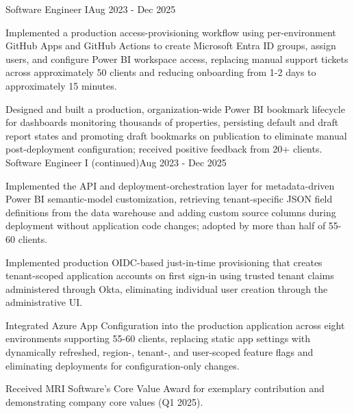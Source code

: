 \vspace{1.0mm}
\resumePositionHeading
{Software Engineer I}{Aug 2023 - Dec 2025}
\vspace{1.5mm}
\resumeItemListStart
    \item{Implemented a production access-provisioning workflow using per-environment GitHub Apps and GitHub Actions to create Microsoft Entra ID groups, assign users, and configure Power BI workspace access, replacing manual support tickets across approximately 50 clients and reducing onboarding from 1-2 days to approximately 15 minutes.}
    \item{Designed and built a production, organization-wide Power BI bookmark lifecycle for dashboards monitoring thousands of properties, persisting default and draft report states and promoting draft bookmarks on publication to eliminate manual post-deployment configuration; received positive feedback from 20+ clients.}
\resumeItemListEnd
\newpage
{}
\resumePositionHeading
{Software Engineer I (continued)}{Aug 2023 - Dec 2025}
\vspace{1.5mm}
\resumeItemListStart
    \item{Implemented the API and deployment-orchestration layer for metadata-driven Power BI semantic-model customization, retrieving tenant-specific JSON field definitions from the data warehouse and adding custom source columns during deployment without application code changes; adopted by more than half of 55-60 clients.}
    \item{Implemented production OIDC-based just-in-time provisioning that creates tenant-scoped application accounts on first sign-in using trusted tenant claims administered through Okta, eliminating individual user creation through the administrative UI.}
    \item{Integrated Azure App Configuration into the production application across eight environments supporting 55-60 clients, replacing static app settings with dynamically refreshed, region-, tenant-, and user-scoped feature flags and eliminating deployments for configuration-only changes.}
    \item{Received MRI Software's Core Value Award for exemplary contribution and demonstrating company core values (Q1 2025).}
\resumeItemListEnd
